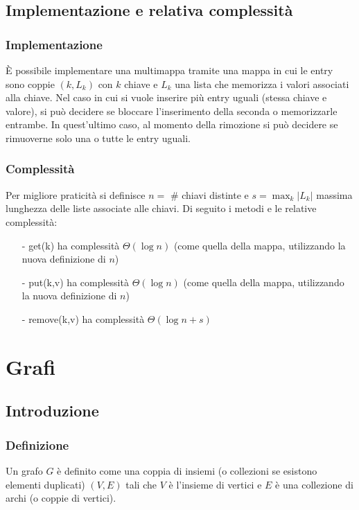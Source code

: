 \documentclass[a4paper]{article}
\begin{document}
\subsection{Implementazione e relativa complessità}
\subsubsection*{Implementazione}
È possibile implementare una multimappa tramite una mappa in cui le entry sono coppie \((k, L_k)\) con \(k\) chiave e \(L_k\) una
lista che memorizza i valori associati alla chiave. Nel caso in cui si vuole inserire più entry uguali (stessa chiave e valore),
si può decidere se bloccare l'inserimento della seconda o memorizzarle entrambe. In quest'ultimo caso, al momento della rimozione
si può decidere se rimuoverne solo una o tutte le entry uguali.

\subsubsection*{Complessità}
Per migliore praticità si definisce \(n =\) \# chiavi distinte e \(s = \max_k |L_k|\) massima lunghezza delle liste associate
alle chiavi. Di seguito i metodi e le relative complessità:
\begin{itemize}[topsep=3pt, itemsep=0pt]
	\item[-] get(k) ha complessità \(\Theta(\log n)\) (come quella della mappa, utilizzando la nuova definizione di \(n\))
	\item[-] put(k,v) ha complessità \(\Theta(\log n)\) (come quella della mappa, utilizzando la nuova definizione di \(n\))
	\item[-] remove(k,v) ha complessità \(\Theta(\log n + s)\)
\end{itemize}

\newpage

\section{Grafi}
\subsection{Introduzione}
\subsubsection*{Definizione}
Un grafo \(G\) è definito come una coppia di insiemi (o collezioni se esistono elementi duplicati) \((V, E)\) tali che \(V\)
è l'insieme di vertici e \(E\) è una collezione di archi (o coppie di vertici). 
\end{document}
